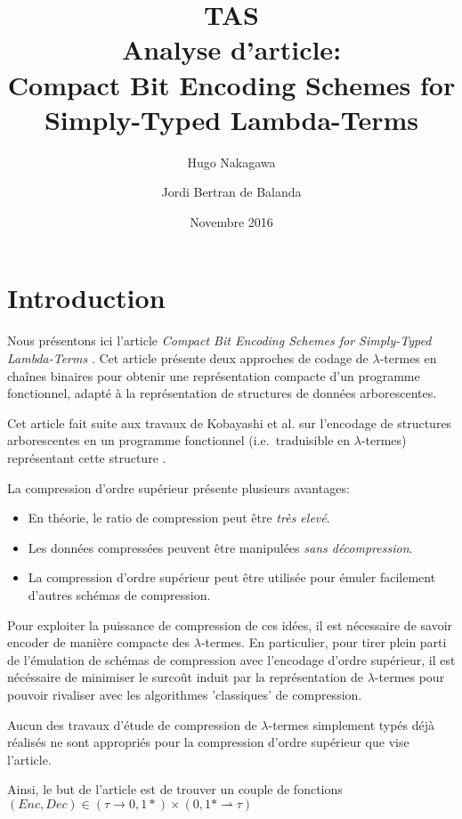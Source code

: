 \documentclass[titlepage]{article}
\title{TAS\\
Analyse d'article:\\
Compact Bit Encoding Schemes for Simply-Typed Lambda-Terms}
\author{Hugo Nakagawa \and Jordi Bertran de Balanda}
\date{Novembre 2016}
\providecommand{\tightlist}{%
  \setlength{\itemsep}{0pt}\setlength{\parskip}{0pt}}
\begin{document}
\maketitle
\newpage
{
\setcounter{tocdepth}{3}
\tableofcontents
}
\newpage

\section{Introduction}\label{introduction}

Nous présentons ici l'article \emph{Compact Bit Encoding Schemes for
Simply-Typed Lambda-Terms} \cite{takeda2016compact}. Cet article présente deux
approches de codage de \(\lambda\)-termes en chaînes binaires pour
obtenir une représentation compacte d'un programme fonctionnel, adapté à
la représentation de structures de données arborescentes.

Cet article fait suite aux travaux de Kobayashi et al. sur l'encodage de
structures arborescentes en un programme fonctionnel (i.e.~traduisible
en \(\lambda\)-termes) représentant cette structure \cite{kobayashi2012functional}.

La compression d'ordre supérieur présente plusieurs avantages:

\begin{itemize}
\tightlist
\item
  En théorie, le ratio de compression peut être \emph{très elevé}.
\item
  Les données compressées peuvent être manipulées \emph{sans
  décompression}.
\item
  La compression d'ordre supérieur peut être utilisée pour émuler
  facilement d'autres schémas de compression.
\end{itemize}

Pour exploiter la puissance de compression de ces idées, il est
nécessaire de savoir encoder de manière compacte des \(\lambda\)-termes.
En particulier, pour tirer plein parti de l'émulation de schémas de compression
avec l'encodage d'ordre supérieur, il est nécéssaire de minimiser le surcoût
induit par la représentation de $\lambda$-termes pour pouvoir rivaliser avec
les algorithmes 'classiques' de compression.

Aucun des travaux d'étude de compression de \(\lambda\)-termes
simplement typés déjà réalisés ne sont appropriés pour la compression
d'ordre supérieur que vise l'article.

Ainsi, le but de l'article est de trouver un couple de fonctions
\((Enc, Dec) \in (\tau \rightarrow {0, 1}*) \times ({0, 1}* \rightharpoonup \tau)\)
\end{document}
